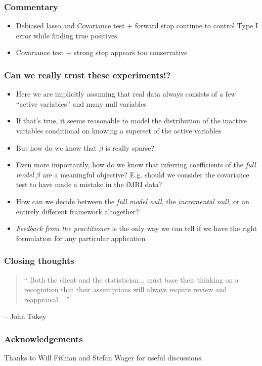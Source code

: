 \documentclass{beamer}
\begin{document}
\begin{frame}
\frametitle{Commentary}
\begin{itemize}
\item Debiased lasso and Covariance test + forward stop continue to control Type I error while finding true positives
\item Covariance test + strong stop appears too conservative
\end{itemize}
\end{frame}


\begin{frame}
\frametitle{Can we really trust these experiments!?}
\begin{itemize}
\item<1-> Here we are implicitly assuming that real data always consists of a few ``active variables'' and many null variables
\item<1-> If that's true, it seems reasonable to model the distribution of the inactive variables conditional on knowing a superset of the active variables
\item<2-> But how do we know that $\beta$ is really sparse?
\item<2-> Even more importantly, how do we know that inferring coefficients of the
  \emph{full model} $\beta$ are a meaningful objective?  E.g. should we consider the
  covariance test to have made a mistake in the fMRI data?
\item<3-> How can we decide between the \emph{full model null}, the
  \emph{incremental null}, or an entirely different framework
  altogether?
\item<3-> \emph{Feedback from the practitioner} is the only way we can
  tell if we have the right formulation for any particular application
\end{itemize}
\end{frame}

\begin{frame}
\frametitle{Closing thoughts}
\begin{quotation}
`` Both the client and the statistician... must base their thinking on
  a recognition that their assumptions will always require review and
  reappraisal...  ''
\end{quotation}
\hfill -- John Tukey
\end{frame}

\begin{frame}
\frametitle{Acknowledgements}
Thanks to Will Fithian and Stefan Wager for useful discussions.
\end{frame}
\end{document}

